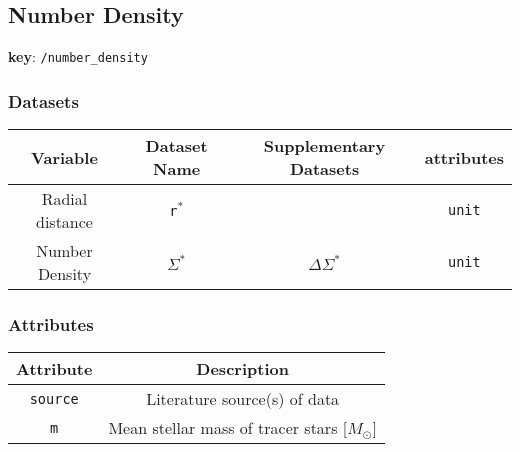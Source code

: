 \subsection{Number Density}

\textbf{key}: \texttt{/number\_density}

\subsubsection{Datasets}

\begin{center}
\begin{table}[H]
\begin{tabular}{ | c | c | c | c | }
    \hline
    Variable & Dataset Name & Supplementary Datasets &  attributes \\
    \hline\hline
    Radial distance & \texttt{r\(^*\)} & & \texttt{unit} \\
    \hline
    Number Density & \texttt{\(\Sigma^*\)} & \texttt{\(\Delta\Sigma^*\)} & \texttt{unit} \\
    \hline

\end{tabular}
\end{table}
\end{center}

\subsubsection{Attributes}


\begin{center}
\begin{table}[H]
\begin{tabular}{ | c | c | }
    \hline
    Attribute & Description \\
    \hline\hline
    \texttt{source} & Literature source(s) of data \\
    \hline
    \texttt{m} & Mean stellar mass of tracer stars [\(M_\odot\)] \\
    \hline
\end{tabular}
\end{table}
\end{center}
